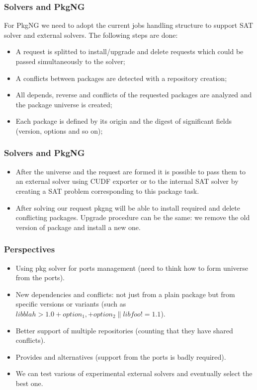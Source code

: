 \documentclass{beamer}
\begin{document}
\begin{frame}
\frametitle{Solvers and PkgNG}

For PkgNG we need to adopt the current jobs handling structure to support SAT
solver and external solvers. The following steps are done:
\begin{itemize}
  \item A request is splitted to install/upgrade and delete requests which
  could be passed simultaneously to the solver;
  \item A conflicts between packages are detected with a repository creation;
  \item All depends, reverse and conflicts of the requested packages are
  analyzed and the package universe is created;
  \item Each package is defined by its origin and the digest of significant
  fields (version, options and so on);
\end{itemize}
\end{frame}

\begin{frame}
\frametitle{Solvers and PkgNG}
\begin{itemize}
  \item After the universe and the request are formed it is possible to pass them to an
external solver using CUDF exporter or to the internal SAT solver by creating a
SAT problem corresponding to this package task.
  \item After solving our request pkgng will be able to install required and
delete conflicting packages. Upgrade procedure can be the same: we remove the old
version of package and install a new one.
\end{itemize}
\end{frame}

\begin{frame}
\frametitle{Perspectives}

\begin{itemize}
  \item Using pkg solver for ports management (need to think how to form
  universe from the ports).
  \item New dependencies and conflicts: not just from a plain package but from
  specific versions or variants (such as $libblah > 1.0 +option_1, +option_2 \|
  libfoo != 1.1$).
  \item Better support of multiple repositories (counting that they have shared
  conflicts).
  \item Provides and alternatives (support from the ports is badly required).
  \item We can test various of experimental external solvers and eventually
  select the best one.
\end{itemize}
\end{frame}
\end{document}
